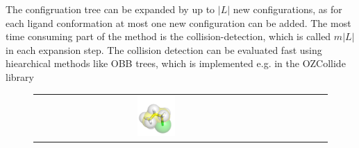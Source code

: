 \documentclass{svmult}
\def\L{L}
\begin{document}
The configruation tree can be expanded by up to $|\L|$ new configurations, as for each ligand conformation at most
one new configuration can be added.
The most time consuming part of the method is the collision-detection, which is called $m|\L|$ in each expansion step.
The collision detection can be evaluated fast using hiearchical methods like OBB trees, which is implemented e.g. in the OZCollide library~\cite{ozcollide}

\def\tmpa{0.16\textwidth}

\begin{figure}
\centering
\begin{tabular}{cccccc}
\includegraphics[width=\tmpa]{fig/m003-000} &

\end{tabular}
\end{figure}
\end{document}
